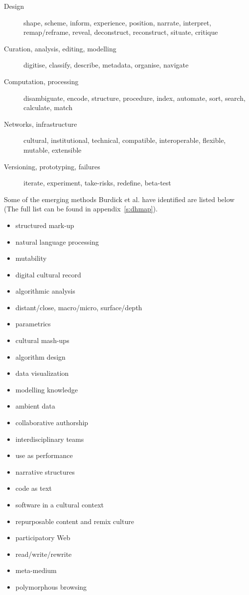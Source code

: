 \documentclass[11pt]{thesis} %
\begin{document}
\begin{description}
  \item [Design] shape, scheme, inform, experience, position, narrate,
  					interpret, remap/reframe, reveal, deconstruct, reconstruct,
  					situate, critique
  \item [Curation, analysis, editing, modelling] digitise, classify, describe, metadata, organise, navigate
  \item [Computation, processing] disambiguate, encode, structure, procedure, index, automate, sort, search, calculate, match
  \item [Networks, infrastructure] cultural, institutional, technical, compatible, interoperable, flexible, mutable, extensible
  \item [Versioning, prototyping, failures]	iterate, experiment, take-risks, redefine, beta-test
\end{description}

Some of the emerging methods Burdick et al. have identified are listed below \citeyear{Burdick2012} (The full list can be found in appendix~\ref{s:dhmap}).

\begin{itemize}
  \item structured mark-up
  \item	natural language processing
  \item	mutability
  \item	digital cultural record
  \item	algorithmic analysis
  \item distant/close, macro/micro, surface/depth
  \item parametrics
  \item	cultural mash-ups
  \item	algorithm design
  \item data visualization
  \item	modelling knowledge
  \item	ambient data
  \item	collaborative authorship
  \item	interdisciplinary teams
  \item	use as performance
  \item narrative structures
  \item	code as text
  \item	software in a cultural context
  \item repurposable content and remix culture
  \item participatory Web
  \item	read/write/rewrite
  \item	meta-medium
  \item	polymorphous browsing
\end{itemize}
\end{document}
